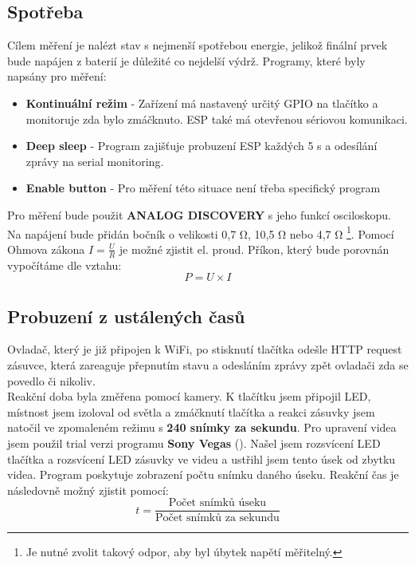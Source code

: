 \documentclass[a4paper, 12pt]{report}
\begin{document}
    \subsection{Spotřeba}
    \label{subsec:ustalene-stavy-spotreba}
    Cílem měření je nalézt stav s nejmenší spotřebou energie, jelikož finální prvek bude napájen z baterií je důležité co nejdelší výdrž. Programy, které byly napsány pro měření:\\
    \begin{itemize}
        \item \textbf{Kontinuální režim} - Zařízení má nastavený určitý GPIO na tlačítko a monitoruje zda bylo zmáčknuto. ESP také má otevřenou sériovou komunikaci.
        \item \textbf{Deep sleep} - Program zajišťuje probuzení ESP každých 5 \si{s} a odesílání zprávy na serial monitoring.
        \item \textbf{Enable button} - Pro měření této situace není třeba specifický program
    \end{itemize}
    Pro měření bude použit \textbf{ANALOG DISCOVERY} s jeho funkcí osciloskopu. Na napájení bude přidán bočník o velikosti 0,7 \si{\ohm}, 10,5 \si{\ohm} nebo 4,7 \si{\ohm} \footnote{Je nutné zvolit takový odpor, aby byl úbytek napětí měřitelný.}. Pomocí Ohmova zákona $ I = \frac{U}{R} $ je možné zjistit el. proud.
    Příkon, který bude porovnán vypočítáme dle vztahu:
    \[P = U \times I\]

    \subsection{Probuzení z ustálených časů}
    \label{subsec:ustalene-stavy-reakce}
    Ovladač, který je již připojen k WiFi, po stisknutí tlačítka odešle HTTP request zásuvce, která zareaguje přepnutím stavu a odesláním zprávy zpět ovladači zda se povedlo či nikoliv.\\
    Reakční doba byla změřena pomocí kamery. K tlačítku jsem připojil LED, místnost jsem izoloval od světla a zmáčknutí tlačítka a reakci zásuvky jsem natočil ve zpomaleném režimu s \textbf{240 snímky za sekundu}. Pro upravení videa jsem použil trial verzi programu \textbf{Sony Vegas} (). Našel jsem rozsvícení LED tlačítka a rozsvícení LED zásuvky ve videu a ustřihl jsem tento úsek od zbytku videa. Program poskytuje zobrazení počtu snímku daného úseku. Reakční čas je následovně možný zjistit pomocí:
    \[ t = \frac{\textrm{Počet snímků úseku}}{\textrm{Počet snímků za sekundu}}\]
\end{document}

